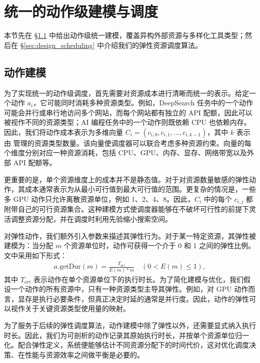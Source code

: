 \section{统一的动作级建模与调度}

本节先在 \S\ref{sec:design_modeling} 中给出动作级统一建模，覆盖异构外部资源与多样化工具类型；然后在 \S\ref{sec:design_scheduling} 中介绍我们的弹性资源调度算法。

\subsection{动作建模}
\label{sec:design_modeling}

为了实现统一的动作级调度，首先需要对资源成本进行清晰而统一的表示。给定一个动作 $a_i$，它可能同时消耗多种资源类型。例如，DeepSearch 任务中的一个动作可能会并行或串行地访问多个网站，而每个网站都有独立的 API 配额，因此可以被视作不同的资源类型；AI 编程任务中的一个动作则既依赖 CPU 也依赖内存。因此，我们将动作成本表示为多维向量 $C_i = (c_{i,0}, c_{i,1},...,c_{i,k-1})$，其中 $k$ 表示由 \sysname 管理的资源类型数量。该向量使调度器可以联合考虑多种资源约束。向量的每个维度分别对应一种资源消耗，包括 CPU、GPU、内存、显存、网络带宽以及外部 API 配额等。

更重要的是，单个资源维度上的成本并不是静态值。对于对资源数量敏感的弹性动作，其成本通常表示为从最小可行值到最大可行值的范围。更复杂的情况是，一些多 GPU 动作只允许离散资源单位，例如 1、2、4、8。因此，$C_i$ 中的每个 $c_{i,j}$ 都附带自己的可行资源集合。这种建模方式使调度器能够在不破坏可行性的前提下灵活调整资源分配，并在调度时利用先验缩小搜索空间。

对弹性动作，我们额外引入参数来描述其弹性行为。对于某一特定资源，其弹性被建模为：当分配 $m$ 个资源单位时，动作可获得一个介于 0 和 1 之间的弹性比例。文中采用如下形式：
\begin{equation}
\label{equ:scale}
\begin{aligned}
a.\text{getDur}(m) = \frac{T_{ori}}{E(m) * m}\quad (0<E(m)\le1),
\end{aligned}
\end{equation}
其中 $T_{ori}$ 表示动作在单个资源单位下的执行时长。为了简化建模与优化，我们假设一个动作的所有资源中，只有一种资源类型主导其弹性。例如，对 GPU 动作而言，显存是执行必要条件，但真正决定时延的通常是并行度。因此，动作的弹性可以视作关于关键资源类型使用量的映射。

为了服务于后续的弹性调度算法，动作建模中除了弹性以外，还需要显式纳入执行时长。因此，我们为可剖析的动作记录其原始执行时长，并按单个资源单位归一化。配合弹性定义，系统便能够估计不同资源分配下的时间代价，这对优化调度决策、在性能与资源效率之间做平衡是必要的。

